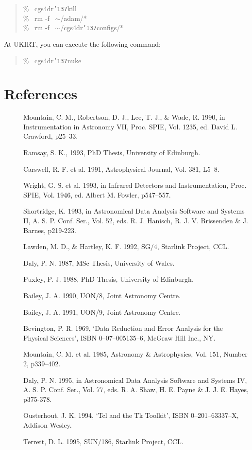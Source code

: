 \documentclass[a4paper]{book}
\newcommand{\stardocinitials}  {SUN}
\newcommand{\stardocnumber}    {27.5}
\newcommand{\stardocname}{\stardocinitials /\stardocnumber}
\renewcommand{\_}{{\tt\char'137}}
\begin{document}
\begin{quote}
  \% \ cgs4dr\_kill \\
  \% \ rm -f \ $\sim$/adam/* \\
  \% \ rm -f \ $\sim$/cgs4dr\_configs/*
\end{quote}

At UKIRT, you can execute the following command:

\begin{quote}
  \% \ cgs4dr\_nuke
\end{quote}

\chapter*{References}
\markboth{References}{\stardocname}

\begin{description}
\item[] Mountain, C. M., Robertson, D. J., Lee, T. J., \& Wade, R. 1990,
      in Instrumentation in Astronomy VII, Proc. SPIE, Vol. 1235, ed. David L. Crawford, p25--33.
\item[] Ramsay, S. K., 1993, PhD Thesis, University of Edinburgh.
\item[] Carswell, R. F. et al. 1991, Astrophysical Journal, Vol. 381, L5--8.
\item[] Wright, G. S. et al. 1993, in Infrared Detectors and Instrumentation, Proc. SPIE,
      Vol. 1946, ed. Albert M. Fowler, p547--557.
\item[] Shortridge, K. 1993, in  Astronomical Data Analysis Software
      and Systems II, A. S. P. Conf. Ser., Vol. 52, eds. R. J. Hanisch,
      R. J. V. Brissenden \& J. Barnes, p219-223.
\item[] Lawden, M. D., \& Hartley, K. F. 1992, SG/4, Starlink Project, CCL.
\item[] Daly, P. N. 1987, MSc Thesis, University of Wales.
\item[] Puxley, P. J. 1988, PhD Thesis, University of Edinburgh.
\item[] Bailey, J. A. 1990, UON/8, Joint Astronomy Centre.
\item[] Bailey, J. A. 1991, UON/9, Joint Astronomy Centre.
\item[] Bevington, P. R. 1969, `Data Reduction and Error Analysis for the Physical Sciences',
      ISBN 0--07--005135--6, McGraw Hill Inc., NY.
\item[] Mountain, C. M. et al. 1985, Astronomy \& Astrophysics, Vol. 151, Number 2, p339--402.
\item[] Daly, P. N. 1995, in Astronomical Data Analysis Software and Systems IV,
      A. S. P. Conf. Ser., Vol. 77, eds. R. A. Shaw, H. E. Payne \& J. J. E. Hayes, p375-378.
\item[] Ousterhout, J. K. 1994, `Tcl and the Tk Toolkit', ISBN 0--201--63337--X, Addison Wesley.
\item[] Terrett, D. L. 1995, SUN/186, Starlink Project, CCL.
\end{description}
\end{document}
